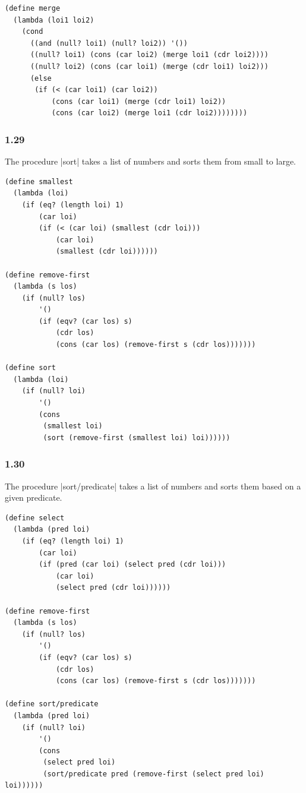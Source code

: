 \documentclass[a4paper]{article}
\begin{document}
\begin{lstlisting}
(define merge
  (lambda (loi1 loi2)
    (cond
      ((and (null? loi1) (null? loi2)) '())
      ((null? loi1) (cons (car loi2) (merge loi1 (cdr loi2))))
      ((null? loi2) (cons (car loi1) (merge (cdr loi1) loi2)))
      (else
       (if (< (car loi1) (car loi2))
           (cons (car loi1) (merge (cdr loi1) loi2))
           (cons (car loi2) (merge loi1 (cdr loi2))))))))
\end{lstlisting}

\subsubsection*{1.29}

The procedure |sort| takes a list of numbers and sorts them from small to large.

\begin{lstlisting}
(define smallest
  (lambda (loi)
    (if (eq? (length loi) 1)
        (car loi)
        (if (< (car loi) (smallest (cdr loi)))
            (car loi)
            (smallest (cdr loi))))))

(define remove-first
  (lambda (s los)
    (if (null? los)
        '()
        (if (eqv? (car los) s)
            (cdr los)
            (cons (car los) (remove-first s (cdr los)))))))

(define sort
  (lambda (loi)
    (if (null? loi)
        '()
        (cons
         (smallest loi)
         (sort (remove-first (smallest loi) loi))))))
\end{lstlisting}

\subsubsection*{1.30}

The procedure |sort/predicate| takes a list of numbers and sorts them based on a given predicate.

\begin{lstlisting}
(define select
  (lambda (pred loi)
    (if (eq? (length loi) 1)
        (car loi)
        (if (pred (car loi) (select pred (cdr loi)))
            (car loi)
            (select pred (cdr loi))))))

(define remove-first
  (lambda (s los)
    (if (null? los)
        '()
        (if (eqv? (car los) s)
            (cdr los)
            (cons (car los) (remove-first s (cdr los)))))))

(define sort/predicate
  (lambda (pred loi)
    (if (null? loi)
        '()
        (cons
         (select pred loi)
         (sort/predicate pred (remove-first (select pred loi) loi))))))
\end{lstlisting}
\end{document}
